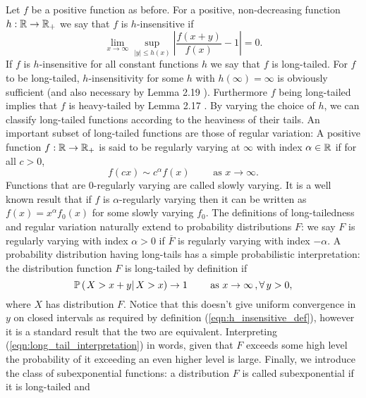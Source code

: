 Let $f$ be a positive function as before. For a positive, non-decreasing function $h:\mathbb{R} \to \mathbb{R}_+$ we say that $f$ is $h$-insensitive if 
\begin{equation}\label{eqn:h_insensitive_def}
\lim\limits_{x \to \infty} \sup\limits_{|y| \leq h(x)} \left\lvert \frac{f(x+y)}{f(x)} - 1 \right\rvert = 0. 
\end{equation}
If $f$ is $h$-insensitive for all constant functions $h$ we say that $f$ is long-tailed. For $f$ to be long-tailed, $h$-insensitivity for some $h$ with $h(\infty) = \infty$ is obviously sufficient (and also necessary by Lemma 2.19 \cite{foss2011introduction}). Furthermore $f$ being long-tailed implies that $f$ is heavy-tailed by Lemma 2.17 \cite{foss2011introduction}. By varying the choice of $h$, we can classify long-tailed functions according to the heaviness of their tails. An important subset of long-tailed functions are those of regular variation: A positive function $f:\mathbb{R} \to \mathbb{R}_+$ is said to be regularly varying at $\infty$ with index $\alpha \in \mathbb{R}$ if for all $c > 0$, 
\begin{equation}\nonumber
f(cx) \sim c^\alpha f(x) \qquad\text{ as } x \to \infty. 
\end{equation}
Functions that are $0$-regularly varying are called slowly varying. It is a well known result that if $f$ is $\alpha$-regularly varying then it can be written as $f(x) = x^\alpha f_0(x)$ for some slowly varying $f_0$. The definitions of long-tailedness and regular variation naturally extend to probability distributions $F$: we say $F$ is regularly varying with index $\alpha > 0$ if $\overline{F}$ is regularly varying with index $- \alpha$. A probability distribution having long-tails has a simple probabilistic interpretation: the distribution function $F$ is long-tailed by definition if 
\begin{equation}\label{eqn:long_tail_interpretation}
\mathbb{P} \left( \left. X > x + y \right| X > x \right) \to 1 \qquad\text{ as } x \to \infty\,, \forall\, y > 0, 
\end{equation}
where $X$ has distribution $F$. Notice that this doesn't give uniform convergence in $y$ on closed intervals as required by definition (\ref{eqn:h_insensitive_def}), however it is a standard result that the two are equivalent. Interpreting (\ref{eqn:long_tail_interpretation}) in words, given that $F$ exceeds some high level the probability of it exceeding an even higher level is large. Finally, we introduce the class of subexponential functions: a distribution $F$ is called subexponential if it is long-tailed and 
